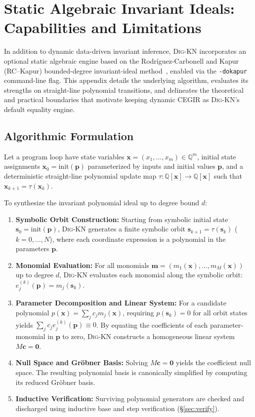 \documentclass[runningheads]{llncs}
\newcommand{\tool}{\textsc{Dig-KN}\xspace}
\newcommand{\code}[1]{\texttt{\small #1}}
\begin{document}
\section{Static Algebraic Invariant Ideals: Capabilities and Limitations}
\label{sec:appendix_kapur}

In addition to dynamic data-driven invariant inference, \tool{} incorporates an optional static algebraic engine based on the Rodr\'iguez-Carbonell and Kapur (RC--Kapur) bounded-degree invariant-ideal method~\cite{rodriguez2007kapur,rodriguez2007simple}, enabled via the \code{-dokapur} command-line flag.  This appendix details the underlying algorithm, evaluates its strengths on straight-line polynomial transitions, and delineates the theoretical and practical boundaries that motivate keeping dynamic CEGIR as \tool{}'s default equality engine.

\subsection{Algorithmic Formulation}
Let a program loop have state variables $\mathbf{x} = (x_1, \dots, x_m) \in \mathbb{Q}^m$, initial state assignments $\mathbf{x}_0 = \text{init}(\mathbf{p})$ parameterized by inputs and initial values $\mathbf{p}$, and a deterministic straight-line polynomial update map $\tau: \mathbb{Q}[\mathbf{x}] \to \mathbb{Q}[\mathbf{x}]$ such that $\mathbf{x}_{k+1} = \tau(\mathbf{x}_k)$.

To synthesize the invariant polynomial ideal up to degree bound $d$:
\begin{enumerate}[leftmargin=1.5em]
\item \textbf{Symbolic Orbit Construction:} Starting from symbolic initial state $\mathbf{s}_0 = \text{init}(\mathbf{p})$, \tool{} generates a finite symbolic orbit $\mathbf{s}_{k+1} = \tau(\mathbf{s}_k)$ ($k = 0, \dots, N$), where each coordinate expression is a polynomial in the parameters $\mathbf{p}$.
\item \textbf{Monomial Evaluation:} For all monomials $\mathbf{m} = (m_1(\mathbf{x}), \dots, m_M(\mathbf{x}))$ up to degree $d$, \tool{} evaluates each monomial along the symbolic orbit: $e_j^{(k)}(\mathbf{p}) = m_j(\mathbf{s}_k)$.
\item \textbf{Parameter Decomposition and Linear System:} For a candidate polynomial $p(\mathbf{x}) = \sum_j c_j m_j(\mathbf{x})$, requiring $p(\mathbf{s}_k) = 0$ for all orbit states yields $\sum_j c_j e_j^{(k)}(\mathbf{p}) \equiv 0$. By equating the coefficients of each parameter-monomial in $\mathbf{p}$ to zero, \tool{} constructs a homogeneous linear system $M \mathbf{c} = \mathbf{0}$.
\item \textbf{Null Space and Gr\"obner Basis:} Solving $M \mathbf{c} = \mathbf{0}$ yields the coefficient null space. The resulting polynomial basis is canonically simplified by computing its reduced Gr\"obner basis.
\item \textbf{Inductive Verification:} Surviving polynomial generators are checked and discharged using inductive base and step verification (\S\ref{sec:verify}).
\end{enumerate}
\end{document}
